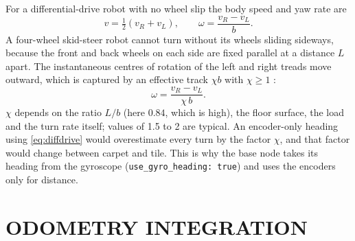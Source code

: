 For a differential-drive robot with no wheel slip the body speed and yaw rate
are
\begin{equation}\label{eq:diffdrive}
v = \tfrac12(v_R+v_L),\qquad \omega = \frac{v_R-v_L}{b}.
\end{equation}
A four-wheel skid-steer robot cannot turn without its wheels sliding
sideways, because the front and back wheels on each side are fixed parallel
at a distance $L$ apart. The instantaneous centres of rotation of the left and
right treads move outward, which is captured by an effective track
$\chi b$ with $\chi\ge1$ \cite{mandow2007skid,martinez2005icr}:
\begin{equation}\label{eq:skidkin}
\omega = \frac{v_R-v_L}{\chi\,b}.
\end{equation}
$\chi$ depends on the ratio $L/b$ (here $0.84$, which is high), the floor
surface, the load and the turn rate itself; values of 1.5 to 2 are typical. An
encoder-only heading using \eqref{eq:diffdrive} would overestimate every turn
by the factor $\chi$, and that factor would change between carpet and tile.
This is why the base node takes its heading from the gyroscope
(\texttt{use\_gyro\_heading: true}) and uses the encoders only for distance.

\section{ODOMETRY INTEGRATION}
\label{sec:odom}

